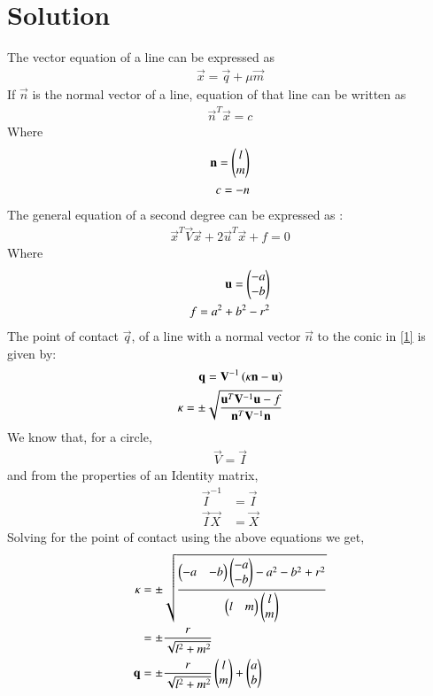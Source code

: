 \documentclass[journal,12pt,twocolumn]{IEEEtran}
\begin{document}
\section*{Solution}
The vector equation of a line can be expressed as 
\begin{align}
    \vec{x} = \vec{q} +\mu\vec{m}
\end{align}
If $\vec{n}$ is the normal vector of a line, equation of that line can be written as 
\begin{align}
    \vec{n}^T\vec{x} = c 
\end{align}
Where
\begin{align}
    \mathbf{n} = \begin{pmatrix}l \\ m\end{pmatrix}\\
    c=-n
\end{align}
The general equation of a second degree can be expressed as :
\begin{align}
    \vec{x}^T\vec{V}\vec{x}+2\vec{u}^T\vec{x}+f=0\label{1}
\end{align}
Where
\begin{align}
    \mathbf{u}=\begin{pmatrix}-a \\ -b\end{pmatrix}\\
    f=a^2+b^2-r^2
\end{align}
The point of contact $\vec{q}$, of a line with a normal vector $\vec{n}$ to the conic in \eqref{1} is given by:
\begin{align}
    \mathbf{q} = \mathbf{V}^{-1}\left(\kappa \mathbf{n}-\mathbf{u}\right)\\
    \kappa = \pm \sqrt{\frac{\mathbf{u}^T\mathbf{V}^{-1}\mathbf{u}-f}{\mathbf{n}^T\mathbf{V}^{-1}\mathbf{n}}} \label{eq:solutions/4/2/8/eq4}
\end{align}
We know that, for a circle, 
\begin{align}
\vec{V} = \vec{I}
\end{align}
and from the properties of an Identity matrix, 
\begin{align}
\vec{I}^{-1} &= \vec{I} \\
\vec{I}\vec{X} &= \vec{X}   
\end{align}
Solving for the point of contact using the above equations we get,
\begin{align}
\kappa &= \pm \sqrt{\frac{\begin{pmatrix} -a & -b\end{pmatrix}\begin{pmatrix}-a \\ -b\end{pmatrix} - a^2-b^2+r^2}{\begin{pmatrix}l & m \end{pmatrix}\begin{pmatrix}l \\ m \end{pmatrix}}} \\
&= \pm \frac{r}{\sqrt{l^2+m^2}} \\
\mathbf{q}&=\pm\frac{r}{\sqrt{l^2+m^2}}\begin{pmatrix}l\\m\end{pmatrix}+\begin{pmatrix}a\\b\end{pmatrix}\\
\end{align}
\end{document}
